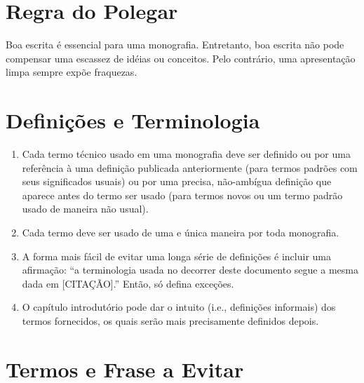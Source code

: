 \section{Regra do Polegar}

Boa escrita é essencial para uma monografia. Entretanto, boa escrita não pode compensar uma escassez de idéias ou conceitos.
Pelo contrário, uma apresentação limpa sempre expõe fraquezas.

\section{Definições e Terminologia}

\begin{enumerate}

	\item Cada termo técnico usado em uma monografia deve ser definido ou por uma referência à uma definição publicada anteriormente (para termos padrões com seus significados usuais)
	ou por uma precisa, não-ambígua definição que aparece antes do termo ser usado (para termos novos ou um termo padrão usado de maneira não usual).

	\item Cada termo deve ser usado de uma e única maneira por toda monografia.			

	\item A forma mais fácil de evitar uma longa série de definições é incluir uma afirmação: ``a terminologia usada no decorrer deste documento segue a mesma dada em [CITAÇÃO].''
	Então, só defina exceções.

	\item O capítulo introdutório pode dar o intuito (i.e., definições informais) dos termos fornecidos, os quais serão mais precisamente definidos depois.

\end{enumerate}

\section{Termos e Frase a Evitar}
	
